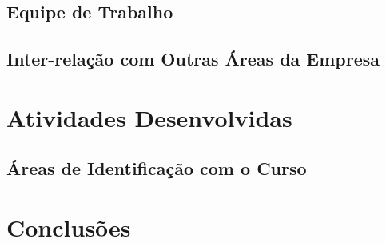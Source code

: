 \documentclass[
	12pt,				%
	oneside,			%
	a4paper,			%
	chapter=TITLE,		%
	section=TITLE,		%
	sumario=tradicional %
	english,			%
	french,				%
	spanish,			%
	brazil				%
	]{abntex2}
\begin{document}
\section{Equipe de Trabalho}
\label{sec:equipetrabalho}

\section{Inter-relação com Outras Áreas da Empresa}
\label{sec:relacaoareas}

\chapter{Atividades Desenvolvidas}
\label{chap:chap5}

\section{Áreas de Identificação com o Curso}
\label{sec:identcurso}

\chapter{Conclusões}
\label{chap:chap6}


%

\postextual

%


\printindex
\end{document}
